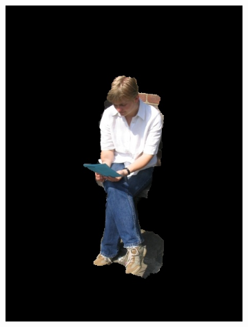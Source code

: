 \documentclass[a4paper,11]{article}
\begin{document}
\begin{center}
\begin{figure}[H]
\begin{subfigure}{.33\textwidth}
    \end{subfigure}
    \begin{subfigure}{0.33\textwidth}
      \centering
      \includegraphics[width=0.9\linewidth]{results/person6}
   \end{subfigure}\\
    \vspace{1em}
    

\end{figure}
\end{center}
\end{document}
